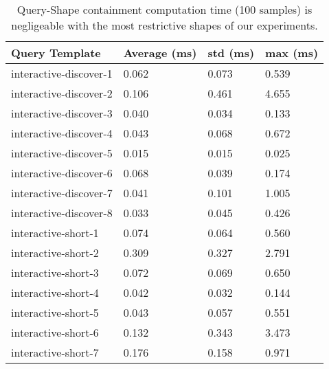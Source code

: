 \begin{table}
	\begin{center}
		\begin{tabular}{|l|l|l|l|}
			\hline
			Query Template & Average (ms) & std (ms) & max (ms) \\
			\hline
			interactive-discover-1 & 0.062 & 0.073 & 0.539 \\
			\hline
			interactive-discover-2 & 0.106 & 0.461 & 4.655 \\
			\hline
			interactive-discover-3 & 0.040 & 0.034 & 0.133 \\
			\hline
			interactive-discover-4 & 0.043 & 0.068 & 0.672 \\
			\hline
			interactive-discover-5 & 0.015 & 0.015 & 0.025 \\
			\hline
			interactive-discover-6 & 0.068 & 0.039 & 0.174 \\
			\hline
			interactive-discover-7 & 0.041 & 0.101 & 1.005 \\
			\hline
			interactive-discover-8 & 0.033 & 0.045 & 0.426 \\
			\hline
			interactive-short-1 & 0.074 & 0.064 & 0.560 \\
			\hline
			interactive-short-2 & 0.309 & 0.327 & 2.791 \\
			\hline
			interactive-short-3 & 0.072 & 0.069 & 0.650 \\
			\hline
			interactive-short-4 & 0.042 & 0.032 & 0.144 \\
			\hline
			interactive-short-5 & 0.043 & 0.057 & 0.551 \\
			\hline
			interactive-short-6 & 0.132 & 0.343 & 3.473 \\
			\hline
			interactive-short-7 & 0.176 & 0.158 & 0.971 \\
			\hline
		\end{tabular}
	\end{center}
	\caption{Query-Shape containment computation time (100 samples) is negligeable with the most restrictive shapes of our experiments.}
	\label{tab:queryShapeContainmentEval}
\end{table}